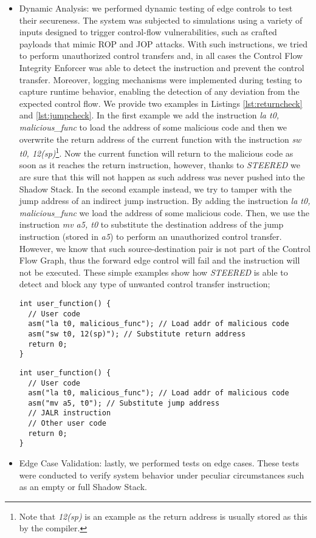\begin{itemize}
  \item Dynamic Analysis: we performed dynamic testing of edge controls to test
    their secureness. The system was subjected to simulations using a variety of
    inputs designed to trigger control-flow vulnerabilities, such as crafted
    payloads that mimic ROP and JOP attacks. With such instructions, we tried to
    perform unauthorized control transfers and, in all cases the Control Flow Integrity
    Enforcer was able to detect the instruction and prevent the control transfer.
    Moreover, logging mechanisms were implemented during testing to capture runtime
    behavior, enabling the detection of any deviation from the expected control
    flow. We provide two examples in Listings \ref{lst:returncheck} and \ref{lst:jumpcheck}.
    In the first example we add the instruction \textit{la t0, malicious\_func} to
    load the address of some malicious code and then we overwrite the return address
    of the current function with the instruction \textit{sw t0, 12(sp)}\footnote{Note
    that \textit{12(sp)} is an example as the return address is usually stored as
    this by the compiler.}. Now the current function will return to the
    malicious code as soon as it reaches the return instruction, however, thanks
    to \textit{STEERED} we are sure that this will not happen as such address was
    never pushed into the Shadow Stack. In the second example instead, we try to
    tamper with the jump address of an indirect jump instruction. By adding the
    instruction \textit{la t0, malicious\_func} we load the address of some malicious
    code. Then, we use the instruction \textit{mv a5, t0} to substitute the
    destination address of the jump instruction (stored in \textit{a5}) to perform
    an unauthorized control transfer. However, we know that such source-destination
    pair is not part of the Control Flow Graph, thus the forward edge control
    will fail and the instruction will not be executed. These simple examples show
    how \textit{STEERED} is able to detect and block any type of unwanted
    control transfer instruction;

    \begin{lstlisting}[style=CStyle, caption = Return address tampering snippet, label={lst:returncheck}]
int user_function() {
  // User code
  asm("la t0, malicious_func"); // Load addr of malicious code
  asm("sw t0, 12(sp)"); // Substitute return address
  return 0;
}
    \end{lstlisting}

    \begin{lstlisting}[style=CStyle, caption = Jump address tampering snippet, label={lst:jumpcheck}]
int user_function() {
  // User code
  asm("la t0, malicious_func"); // Load addr of malicious code
  asm("mv a5, t0"); // Substitute jump address
  // JALR instruction
  // Other user code
  return 0;
}
    \end{lstlisting}

  \item Edge Case Validation: lastly, we performed tests on edge cases. These
    tests were conducted to verify system behavior under peculiar circumstances
    such as an empty or full Shadow Stack.
\end{itemize}

